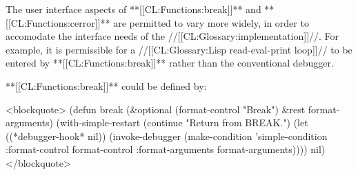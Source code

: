 The user interface aspects of **[[CL:Functions:break]]** and **[[CL:Functions:cerror]]** are permitted to vary more widely, in order to accomodate the interface needs of the //[[CL:Glossary:implementation]]//. For example, it is permissible for a //[[CL:Glossary:Lisp read-eval-print loop]]// to be entered by **[[CL:Functions:break]]** rather than the conventional debugger.

**[[CL:Functions:break]]** could be defined by:

<blockquote> (defun break (&optional (format-control "Break") &rest format-arguments) (with-simple-restart (continue "Return from BREAK.") (let ((*debugger-hook* nil)) (invoke-debugger (make-condition 'simple-condition :format-control format-control :format-arguments format-arguments)))) nil) </blockquote>

  
